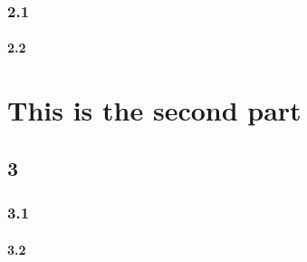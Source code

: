 \documentclass[whitelogo]{tudelft-report}
\begin{document}
\section {2.1}
\subsection {2.2}

\part{This is the second part}
\chapter {3}
\section {3.1}
\subsection {3.2}

%

\appendix

%


\end{document}
